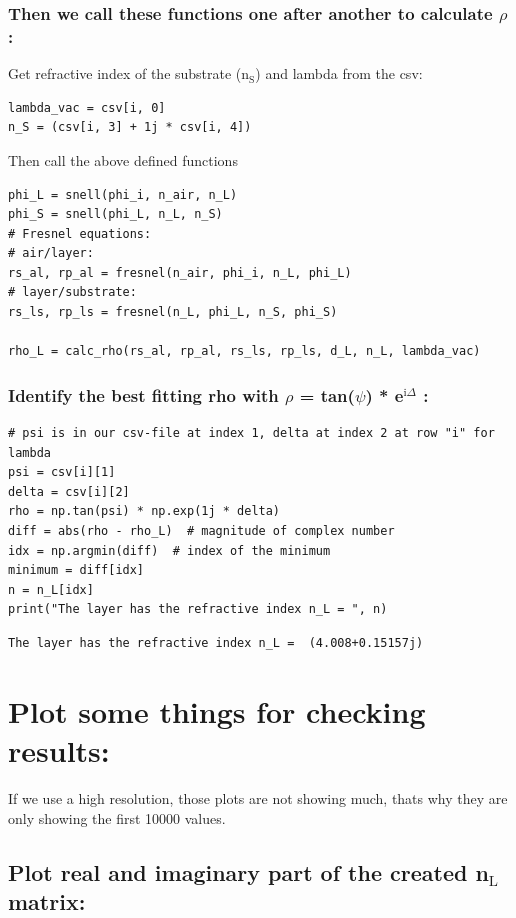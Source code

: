 \documentclass[11pt]{article}
\begin{document}
\subsubsection{Then we call these functions one after another to calculate \(\rho\):}
\label{sec:org4140bbd}
Get refractive index of the substrate (n\(_{\text{S}}\)) and lambda from the csv:
\begin{verbatim}
lambda_vac = csv[i, 0]
n_S = (csv[i, 3] + 1j * csv[i, 4])
\end{verbatim}

Then call the above defined functions
\begin{verbatim}
phi_L = snell(phi_i, n_air, n_L)
phi_S = snell(phi_L, n_L, n_S)
# Fresnel equations:
# air/layer:
rs_al, rp_al = fresnel(n_air, phi_i, n_L, phi_L)
# layer/substrate:
rs_ls, rp_ls = fresnel(n_L, phi_L, n_S, phi_S)

rho_L = calc_rho(rs_al, rp_al, rs_ls, rp_ls, d_L, n_L, lambda_vac)
\end{verbatim}


\subsubsection{Identify the best fitting rho with \(\rho\) = tan(\(\psi\)) * e\(^{\text{i}\Delta}\) :}
\label{sec:org0412a54}

\begin{verbatim}
# psi is in our csv-file at index 1, delta at index 2 at row "i" for lambda
psi = csv[i][1]
delta = csv[i][2]
rho = np.tan(psi) * np.exp(1j * delta)
diff = abs(rho - rho_L)  # magnitude of complex number
idx = np.argmin(diff)  # index of the minimum
minimum = diff[idx]
n = n_L[idx]
print("The layer has the refractive index n_L = ", n)
\end{verbatim}

\begin{verbatim}
The layer has the refractive index n_L =  (4.008+0.15157j)
\end{verbatim}

\section{Plot some things for checking results:}
\label{sec:orga8b9e66}

If we use a high resolution, those plots are not showing much, thats why they are only showing the first 10000 values.
\subsection{Plot real and imaginary part of the created n\(_{\text{L}}\) matrix:}
\label{sec:org7918754}
\end{document}

